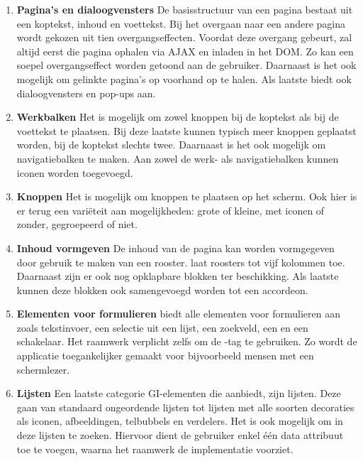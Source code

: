 \begin{enumerate}
\item \textbf{Pagina's en dialoogvensters}
De basisstructuur van een pagina bestaat uit een koptekst, inhoud en voettekst. 
Bij het overgaan naar een andere pagina wordt gekozen uit tien overgangseffecten. 
Voordat deze overgang gebeurt, zal \jqm{} altijd eerst die pagina ophalen via AJAX en inladen in het DOM. 
Zo kan een soepel overgangseffect worden getoond aan de gebruiker. 
Daarnaast is het ook mogelijk om gelinkte pagina's op voorhand op te halen. 
Als laatste biedt \jqm{} ook dialoogvensters en pop-ups aan. 

\item \textbf{Werkbalken}
Het is mogelijk om zowel knoppen bij de koptekst als bij de voettekst te plaatsen. 
Bij deze laatste kunnen typisch meer knoppen geplaatst worden, bij de koptekst slechts twee. 
Daarnaast is het ook mogelijk om navigatiebalken te maken. 
Aan zowel de werk- als navigatiebalken kunnen iconen worden toegevoegd.

\item \textbf{Knoppen}
Het is mogelijk om knoppen te plaatsen op het scherm. 
Ook hier is er terug een variëteit aan mogelijkheden: grote of kleine, met iconen of zonder, gegroepeerd of niet. 

\item \textbf{Inhoud vormgeven}
De inhoud van de pagina kan worden vormgegeven door gebruik te maken van een rooster. 
\jqm{} laat roosters tot vijf kolommen toe. 
Daarnaast zijn er ook nog opklapbare blokken ter beschikking. 
Als laatste kunnen deze blokken ook samengevoegd worden tot een accordeon. 

\item \textbf{Elementen voor formulieren}
\jqm{} biedt alle elementen voor formulieren aan zoals tekstinvoer, een selectie uit een lijst, een zoekveld, een  en een schakelaar. 
Het raamwerk verplicht zelfs om de -tag te gebruiken. 
Zo wordt de applicatie toegankelijker gemaakt voor bijvoorbeeld mensen met een schermlezer.

\item \textbf{Lijsten}
Een laatste categorie GI-elementen die \jqm{} aanbiedt, zijn lijsten. 
Deze gaan van standaard ongeordende lijsten tot lijsten met alle soorten decoraties als iconen, afbeeldingen, telbubbels en verdelers. 
Het is ook mogelijk om in deze lijsten te zoeken. 
Hiervoor dient de gebruiker enkel één data attribuut toe te voegen, waarna het raamwerk de implementatie voorziet. 
\end{enumerate}

